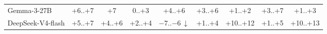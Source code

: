 \begin{table}[tp]
\begin{tabular}{@{}>{\raggedright\arraybackslash}p{1.75cm}cccccccc@{}}
Gemma-3-27B & \cellcolor{cPos!40!white}+6..+7 & \cellcolor{cPos!43!white}+7 & \cellcolor{cPos!15!white}0..+3 & \cellcolor{cPos!33!white}+4..+6 & \cellcolor{cPos!30!white}+3..+6 & \cellcolor{cPos!15!white}+1..+2 & \cellcolor{cPos!33!white}+3..+7 & \cellcolor{cPos!18!white}+1..+3 \\
DeepSeek-V4-flash & \cellcolor{cPos!38!white}+5..+7 & \cellcolor{cPos!33!white}+4..+6 & \cellcolor{cPos!23!white}+2..+4 & \cellcolor{cNeg!40!white}$-7$..$-6$\,$\downarrow$  & \cellcolor{cPos!20!white}+1..+4 & \cellcolor{cPos!55!white}+10..+12 & \cellcolor{cPos!23!white}+1..+5 & \cellcolor{cPos!55!white}+10..+13 \\
\bottomrule
\end{tabular}
\end{table}
